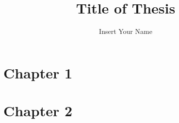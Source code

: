 \documentclass[12pt]{puthesis}
\title{Title of Thesis}
\author{Insert Your Name}
\begin{document}
\chapter{Chapter 1}  %

\chapter{Chapter 2}  %


\end{document}
